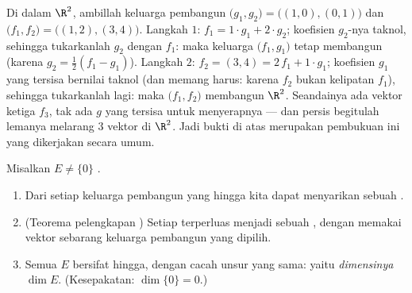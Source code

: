 \begin{example}
\label{ex:b1:findim:exchangerun}
Di dalam $\R^2$, ambillah keluarga pembangun $\bigl(g_1, g_2\bigr) =
\bigl((1,0), (0,1)\bigr)$ dan  $\bigl(f_1,
f_2\bigr) = \bigl((1,2), (3,4)\bigr)$. Langkah $1$: $f_1 = 1\cdot
g_1 + 2\cdot g_2$; koefisien $g_2$-nya taknol, sehingga
tukarkanlah $g_2$ dengan $f_1$: maka keluarga $\bigl(f_1, g_1\bigr)$
tetap membangun (karena $g_2 = \frac12(f_1 - g_1)$). Langkah $2$: $f_2 =
(3,4) = 2\,f_1 + 1\cdot g_1$; koefisien $g_1$ yang tersisa
bernilai taknol (dan memang harus: karena $f_2$ bukan kelipatan $f_1$),
sehingga tukarkanlah lagi: maka $\bigl(f_1, f_2\bigr)$ membangun $\R^2$. Seandainya
ada vektor  ketiga $f_3$, tak ada $g$ yang tersisa untuk
menyerapnya --- dan persis begitulah lemanya melarang $3$ vektor
 di $\R^2$. Jadi bukti di atas merupakan pembukuan ini yang dikerjakan
secara umum.
\end{example}

\begin{theorem}\label{thm:b1:findim:bases}
Misalkan $E \neq \{0\}$ .
\begin{enumerate}
  \item Dari setiap keluarga pembangun yang hingga kita dapat menyarikan sebuah .
  \item (Teorema pelengkapan )
        Setiap  terperluas menjadi sebuah , dengan memakai vektor sebarang
        keluarga pembangun yang dipilih.
  \item Semua  $E$ bersifat hingga, dengan cacah unsur yang
        sama: yaitu \emph{dimensinya} $\dim E$. (Kesepakatan:
        $\dim\{0\} = 0$.)
\end{enumerate}
\end{theorem}

